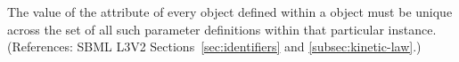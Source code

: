 The value of the attribute  of every \LocalParameter object
defined within a \KineticLaw object must be unique across the set of all
such parameter definitions within that particular \KineticLaw instance.
(References: SBML L3V2 Sections~\ref{sec:identifiers} and
\ref{subsec:kinetic-law}.)
